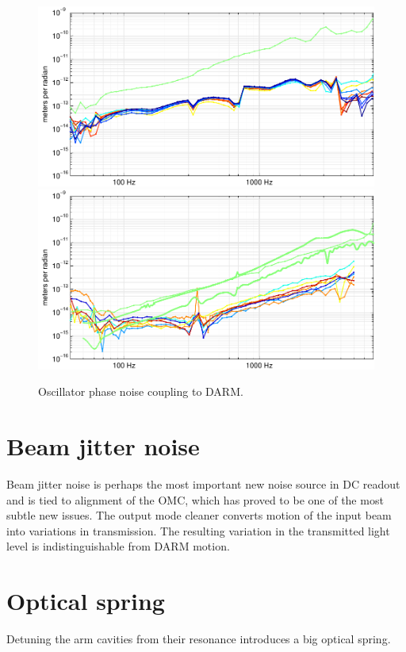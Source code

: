 \begin{figure} %
\includegraphics[]{figures/oscPM-L1.pdf}
\includegraphics[]{figures/oscPM-H1.pdf}
\caption[Oscillator phase noise coupling (measured)]{\label{fig:osc-PM}Oscillator phase noise coupling to DARM.}
\end{figure}

\section{Beam jitter noise}

Beam jitter noise is perhaps the most important new noise source in
DC readout and is tied to alignment of the OMC, which has proved to
be one of the most subtle new issues. The output mode cleaner converts
motion of the input beam into variations in transmission. The resulting
variation in the transmitted light level is indistinguishable from
DARM motion.

\section{Optical spring}
%
Detuning the arm cavities from their resonance introduces a big optical
spring.

